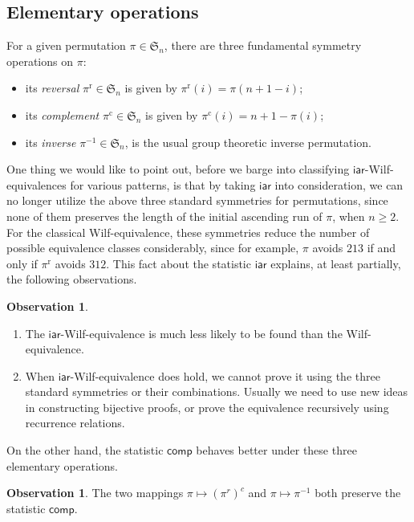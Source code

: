 \documentclass[12pt]{amsart}
\numberwithin{equation}{section}
\theoremstyle{plain}
\theoremstyle{definition}
\newtheorem{Observation}[theorem]{Observation}
\def\S{\mathfrak{S}}
\def\iar{\mathsf{iar}}
\def\comp{\mathsf{comp}}
\begin{document}
\subsection{Elementary operations}
For a given permutation $\pi\in\S_n$, there are three fundamental symmetry operations on $\pi$:
\begin{itemize}
\item its {\em reversal} $\pi^{\mathrm{r}}\in\S_n$ is given by $\pi^{\mathrm{r}}(i)=\pi(n+1-i)$;
\item its {\em complement} $\pi^{\mathrm{c}}\in\S_n$ is given by $\pi^{\mathrm{c}}(i)=n+1-\pi(i)$; 
\item its {\em inverse} $\pi^{-1}\in\S_n$, is the usual group theoretic inverse permutation. 
\end{itemize}
One thing we would like to point out, before we barge into classifying $\iar$-Wilf-equivalences for various patterns, is that by taking $\iar$ into consideration, we can no longer utilize the above three standard symmetries for permutations, since none of them preserves the length of the initial ascending run of $\pi$, when $n\ge 2$.  For the classical Wilf-equivalence, these symmetries reduce the number of possible equivalence classes considerably, since for example, $\pi$ avoids $213$ if and only if $\pi^{\mathrm{r}}$ avoids $312$. This fact about the statistic $\iar$ explains, at least partially, the following observations. 
\begin{Observation}\hfill
\begin{enumerate}
	\item The $\iar$-Wilf-equivalence is much less likely to be found than the Wilf-equivalence. 
	\item When $\iar$-Wilf-equivalence does hold, we cannot prove it using the three standard symmetries or their combinations. Usually we need to use new ideas in constructing bijective proofs, or prove the equivalence recursively using recurrence relations.
\end{enumerate}
\end{Observation}

On the other hand, the statistic $\comp$ behaves better under these three elementary operations. 
\begin{Observation}\label{obs:2}
The two mappings $\pi\mapsto (\pi^r)^c$ and $\pi\mapsto \pi^{-1}$ both preserve the statistic $\comp$. 
\end{Observation}
\end{document}
